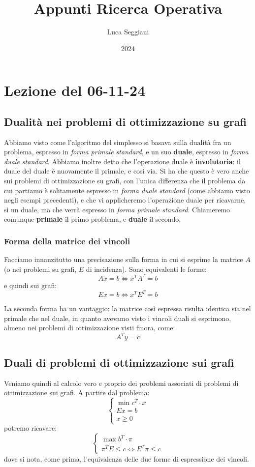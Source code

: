 \documentclass[a4paper,11pt]{article}
\title{Appunti Ricerca Operativa}
\author{Luca Seggiani}
\date{2024}
\begin{document}
\section{Lezione del 06-11-24}

\thispagestyle{empty}
\pagestyle{fancy}

\subsection{Dualità nei problemi di ottimizzazione su grafi}
Abbiamo visto come l'algoritmo del simplesso si basava sulla dualità fra un problema, espresso in \textit{forma primale standard}, e un suo \textbf{duale}, espresso in \textit{forma duale standard}.
Abbiamo inoltre detto che l'operazione duale è \textbf{involutoria}: il duale del duale è nuovamente il primale, e così via.
Si ha che questo è vero anche sui problemi di ottimizzazione su grafi, con l'unica differenza che il problema da cui partiamo è solitamente espresso in \textit{forma duale standard} (come abbiamo visto negli esempi precedenti), e che vi applicheremo l'operazione duale per ricavarne, sì un duale, ma che verrà espresso in \textit{forma primale standard}. 
Chiameremo comunque \textbf{primale} il primo problema, e \textbf{duale} il secondo.

\subsubsection{Forma della matrice dei vincoli}
Facciamo innanzitutto una precisazione sulla forma in cui si esprime la matrice $A$ (o nei problemi su grafi, $E$ di incidenza).
Sono equivalenti le forme:
$$
Ax = b \Leftrightarrow x^T A^T = b
$$
e quindi sui grafi:
$$
Ex = b \Leftrightarrow x^T E^T = b
$$

La seconda forma ha un vantaggio: la matrice così espressa risulta identica sia nel primale che nel duale, in quanto avevamo visto i vincoli duali si esprimono, almeno nei problemi di ottimizzazione visti finora, come:
$$
A^T y = c
$$

\subsection{Duali di problemi di ottimizzazione sui grafi}
Veniamo quindi al calcolo vero e proprio dei problemi associati di problemi di ottimizzazione sui grafi.
A partire dal problema:
\[
	\begin{cases}
		\min c^T \cdot x \\ 
		Ex = b \\ 
		x \geq 0
	\end{cases}
\]
potremo ricavare:
\[
	\begin{cases}
			\max b^T \cdot \pi \\ 
			\pi^T E \leq c \Leftrightarrow E^T\pi \leq c
	\end{cases}
\]
dove si nota, come prima, l'equivalenza delle due forme di espressione dei vincoli.
\end{document}

